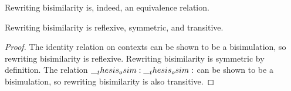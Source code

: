 Rewriting bisimilarity is, indeed, an equivalence relation.
%
\begin{theorem}\label{thm:ordered-bisimilarity:equivalence}
  Rewriting bisimilarity is reflexive, symmetric, and transitive.
\end{theorem}
\begin{proof}
  The identity relation on contexts can be shown to be a bisimulation, so rewriting bisimilarity is reflexive.
  Rewriting bisimilarity is symmetric by definition.
  The relation $\__thesis_osim:\__thesis_osim:$ can be shown to be a bisimulation, so rewriting bisimilarity is also transitive.
\end{proof}






